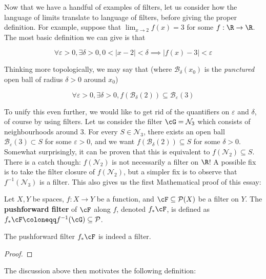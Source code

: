 Now that we have a handful of examples of filters, let us consider how the language of limits translate to language of filters, before giving the proper definition. For example, suppose that \(\lim_{x \to 2} f(x) = 3\) for some \(f : \R \to \R\). The most basic definition we can give is that

\[
  \forall \varepsilon > 0, \exists \delta > 0, 0 < |x - 2| < \delta \implies |f(x) - 3| < \varepsilon
\]

Thinking more topologically, we may say that (where \(\mathcal{B}_{\delta}(x_0)\) is the \textit{punctured} open ball of radius \(\delta > 0\) around \(x_0\))

\[
  \forall \varepsilon > 0, \exists \delta > 0, f\left(\mathcal{B}_{\delta}(2)\right) \subseteq \mathcal{B}_{\varepsilon}(3)
\]

To unify this even further, we would like to get rid of the quantifiers on \(\varepsilon\) and \(\delta\), of course by using filters. Let us consider the filter \(\cG = \mathcal{N}_3\) which consists of neighbourhoods around \(3\). For every \(S \in \mathcal{N}_3\), there exists an open ball \(\mathcal{B}_{\varepsilon}(3) \subset S\) for some \(\varepsilon > 0\), and we want \(f\left(\mathcal{B}_{\delta}(2)\right) \subseteq S\) for some \(\delta > 0\). Somewhat surprisingly, it can be proven that this is equivalent to \(f(\mathcal{N}_2) \subseteq S\). There is a catch though: \(f(\mathcal{N}_2)\) is not necessarily a filter on \(\R\)! A possible fix is to take the filter closure of \(f(\mathcal{N}_2)\), but a simpler fix is to observe that \(f^{-1}(\mathcal{N}_3)\) is a filter. This also gives us the first Mathematical proof of this essay:

\begin{definition}
  Let \(X, Y\) be spaces, \(f : X \to Y\) be a function, and \(\cF \subseteq \mathcal{P}(X)\) be a filter on \(Y\). The \textbf{pushforward filter} of \(\cF\) along \(f\), denoted \(f_*\cF\), is defined as \(f_*\cF \coloneqq f^{-1}(\cG) \subseteq \mathcal{P}\).
\end{definition}

\begin{lemma}
  The pushforward filter \(f_*\cF\) is indeed a filter.
\end{lemma}

\begin{proof}
\end{proof}

The discussion above then motivates the following definition:


